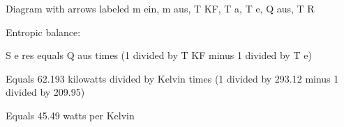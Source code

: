 Diagram with arrows labeled m ein, m aus, T KF, T a, T e, Q aus, T R

Entropic balance:

S e res equals Q aus times (1 divided by T KF minus 1 divided by T e)

Equals 62.193 kilowatts divided by Kelvin times (1 divided by 293.12 minus 1 divided by 209.95)

Equals 45.49 watts per Kelvin